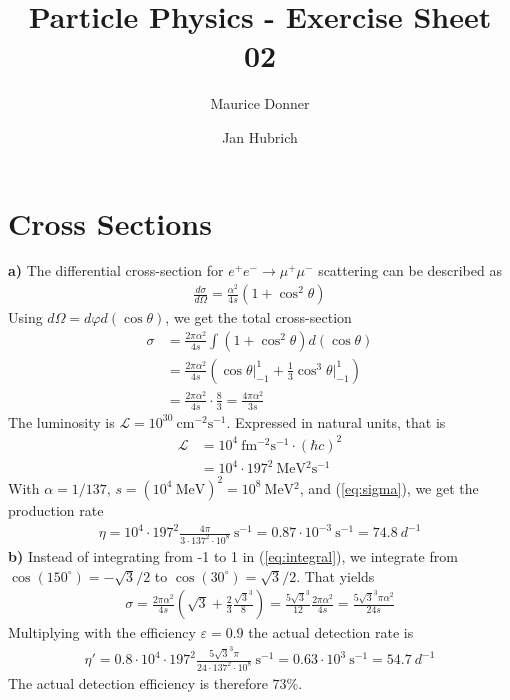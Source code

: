 \documentclass{article}
\title{\textsf{\color{blue!40!black}Particle Physics - Exercise Sheet 02}}
\author{Maurice Donner \and Jan Hubrich}
\begin{document}
\section{Cross Sections}
\textbf{a)} The differential cross-section for \( e^+e^- \rightarrow
    \mu^+\mu^-\) scattering can be described as
\begin{align}
    \frac{d \sigma}{d \Omega} = \frac{\alpha^2}{4s} ( 1 + \cos^2 \theta )
\end{align}
Using \( d \Omega = d \varphi d (\cos \theta) \), we get the total cross-section
\begin{align}
    \sigma &= \frac{2 \pi \alpha ^2}{4s} \int ( 1 + \cos^2 \theta )
    d(\cos \theta) \\
    \label{eq:integral}
    &= \frac{2 \pi \alpha^2}{4s} \left( \cos \theta \Big| _{-1} ^{1} +
	\frac{1}{3} \cos^3 \theta \Big| _{-1} ^{1} \right) \\
    \label{eq:sigma}
    &= \frac{2 \pi \alpha ^2}{4 s} \cdot \frac{8}{3} = \frac{4 \pi \alpha^2}{3s}
\end{align}
The luminosity is \( \mathcal{L} = 10 ^{30} \ \si{\centi
	\meter^{-2} \second ^{-1} } \). Expressed in natural units, that is
\begin{align}
\mathcal{L} &= 10 ^{4} \ \si{\femto \meter ^{-2} \second ^{-1}}
\cdot (\hbar c)^2 \\
&= 10 ^{4} \cdot 197^2 \ \si{\mega \electronvolt ^2 \second ^{-1}}
\end{align}
With \( \alpha = 1/137 \), \( s = (10 ^{4} \ \si{\mega \electronvolt})^2 
= 10 ^{8} \ \si{\mega \electronvolt ^2}\), and (\ref{eq:sigma}), we get the
production rate
\begin{align}
    \eta = 10 ^{4} \cdot 197 ^{2} \frac{4 \pi}{3 \cdot 137 ^{2} \cdot 10 ^{8}}
    \ \si{\second ^{-1}} = 0.87 \cdot 10 ^{-3} \ \si{\second ^{-1}} = 
    74.8 \ \si{d ^{-1} }
\end{align}
\textbf{b)} Instead of integrating from -1 to 1 in (\ref{eq:integral}), we
integrate from \( \cos(150 ^{\circ} ) = -\sqrt{3} /2\) to 
\( \cos(30 ^{\circ} ) = \sqrt{3} /2 \). That yields
\begin{align}
    \sigma = \frac{2 \pi \alpha ^2}{4s} \left( \sqrt{3} + \frac{2}{3} 
	\frac{\sqrt{3} ^{3}}{8} \right) = \frac{5 \sqrt{3} ^{3}}{12}
    \frac{2 \pi \alpha ^2}{4s} = \frac{5 \sqrt{3} ^{3} \pi \alpha ^2}{24 s}
\end{align}
Multiplying with the efficiency \( \varepsilon = 0.9 \) the actual detection
rate is
\begin{align}
    \eta' = 0.8 \cdot 10 ^{4} \cdot 197 ^{2} \frac{5 \sqrt{3} ^{3} \pi}{24
	\cdot 137^2 \cdot 10 ^{8} }
    \ \si{\second ^{-1}} = 0.63 \cdot 10 ^{3} \ \si{\second ^{-1}} = 54.7
    \ \si{d ^{-1}}
\end{align}
The actual detection efficiency is therefore \( 73 \% \).
\end{document}

